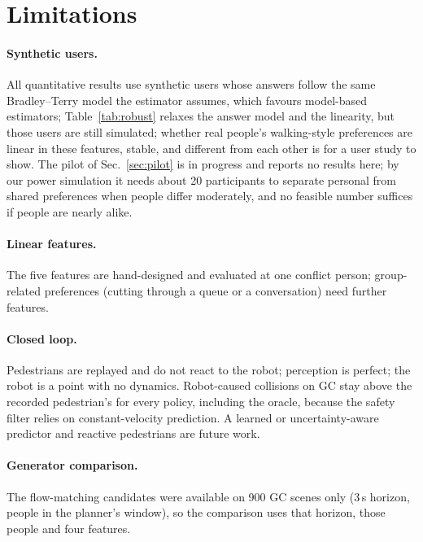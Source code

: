\section{Limitations}
\label{sec:limitations}

\paragraph{Synthetic users.} All quantitative results use synthetic users whose answers follow the same Bradley--Terry model the
estimator assumes, which favours model-based estimators; Table~\ref{tab:robust} relaxes the answer model and the linearity, but those
users are still simulated; whether real people's walking-style preferences are linear in these features,
stable, and different from each other is for a user study to show. The pilot of Sec.~\ref{sec:pilot} is in progress and reports no
results here; by our power simulation it needs about 20 participants to separate personal from shared preferences when people differ
moderately, and no feasible number suffices if people are nearly alike.

\paragraph{Linear features.} The five features are hand-designed and evaluated at one conflict person; group-related preferences
(cutting through a queue or a conversation) need further features.

\paragraph{Closed loop.} Pedestrians are replayed and do not react to the robot; perception is perfect; the robot is a point with no
dynamics. Robot-caused collisions on GC stay above the recorded pedestrian's for every policy, including the oracle, because the safety
filter relies on constant-velocity prediction. A learned or uncertainty-aware predictor and reactive pedestrians are future work.

\paragraph{Generator comparison.} The flow-matching candidates were available on 900 GC scenes only (3\,s horizon, people in the planner's
window), so the comparison uses that horizon, those people and four features.
